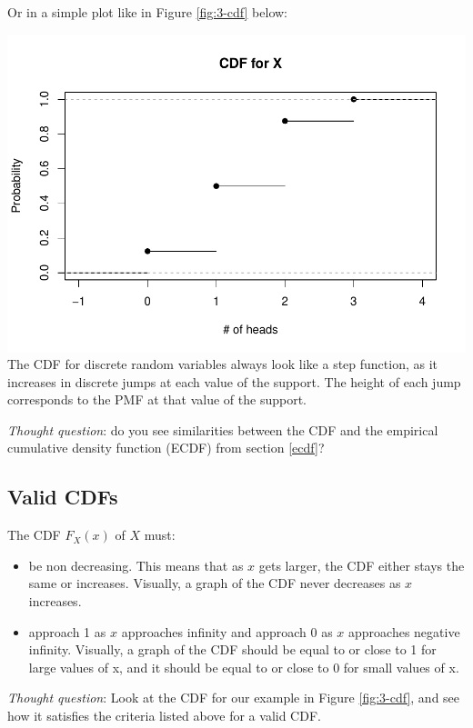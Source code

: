 \documentclass[
]{book}
\providecommand{\tightlist}{%
  \setlength{\itemsep}{0pt}\setlength{\parskip}{0pt}}
\begin{document}
Or in a simple plot like in Figure \ref{fig:3-cdf} below:

\includegraphics{bookdown-demo_files/figure-latex/3-cdf-1.pdf}
The CDF for discrete random variables always look like a step function, as it increases in discrete jumps at each value of the support. The height of each jump corresponds to the PMF at that value of the support.

\emph{Thought question}: do you see similarities between the CDF and the empirical cumulative density function (ECDF) from section \ref{ecdf}?

\subsection{Valid CDFs}\label{valid-cdfs}

The CDF \(F_X(x)\) of \(X\) must:

\begin{itemize}
\tightlist
\item
  be non decreasing. This means that as \(x\) gets larger, the CDF either stays the same or increases. Visually, a graph of the CDF never decreases as \(x\) increases.
\item
  approach 1 as \(x\) approaches infinity and approach 0 as \(x\) approaches negative infinity. Visually, a graph of the CDF should be equal to or close to 1 for large values of x, and it should be equal to or close to 0 for small values of x.
\end{itemize}

\emph{Thought question}: Look at the CDF for our example in Figure \ref{fig:3-cdf}, and see how it satisfies the criteria listed above for a valid CDF.
\end{document}
